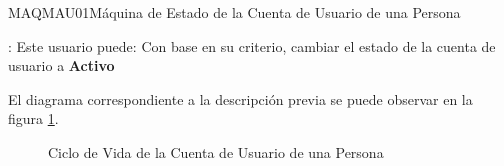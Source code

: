 \begin{Maquina}{MAQMAU01}{Máquina de Estado de la Cuenta de Usuario de una Persona}
\begin{description}
			\begin{Titemize}
			\Titem {}: 	Este usuario puede: Con base en su criterio, cambiar el estado de la cuenta de usuario a \textbf{Activo}
			\end{Titemize}
			
		\end{description}
	El diagrama correspondiente a la descripción previa se puede observar en la figura \ref{fig:maqmau01}.
	\begin{figure}[hbtp!]
	\begin{center}
		\caption{Ciclo de Vida de la Cuenta de Usuario de una Persona}
		\label{fig:maqmau01}
		\end{center}
	\end{figure}

\end{Maquina}

